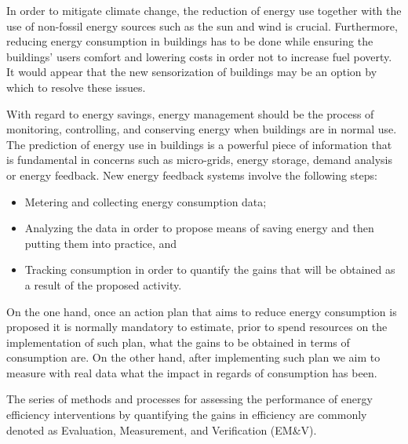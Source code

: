 \documentclass[10pt, conference, compsocconf]{IEEEtran}
\begin{document}
In order to mitigate climate change, the reduction of energy use together with the use of non-fossil energy sources such as the sun and wind is crucial. Furthermore, reducing energy consumption in buildings has to be done while ensuring the buildings' users comfort and lowering costs in order not to increase fuel poverty. It would appear that the new sensorization of buildings may be an option by which to resolve these issues.

With regard to energy savings, energy management should be the process of monitoring, controlling, and conserving energy when buildings are in normal use.  The prediction of energy use in buildings is a powerful piece of information that is fundamental in concerns such as micro-grids, energy storage, demand analysis or energy feedback. New energy feedback systems involve the following steps:

\begin{itemize}
\item Metering and collecting energy consumption data;
\item Analyzing the data in order to propose means of saving energy and then putting them into practice, and
\item Tracking consumption in order to quantify the gains that will be obtained as a result of the proposed activity.
\end{itemize}

On the one hand, once an action plan that aims to reduce energy consumption is proposed it is normally mandatory to estimate, prior to spend resources on the implementation of such plan, what the gains to be obtained in terms of consumption are. On the other hand, after implementing such plan we aim to measure with real data what the impact in regards of consumption has been. 

The series of methods and processes for %
assessing the performance of energy efficiency interventions by quantifying the gains in efficiency are commonly denoted as Evaluation, Measurement, and Verification (EM\&V). 


\end{document}
